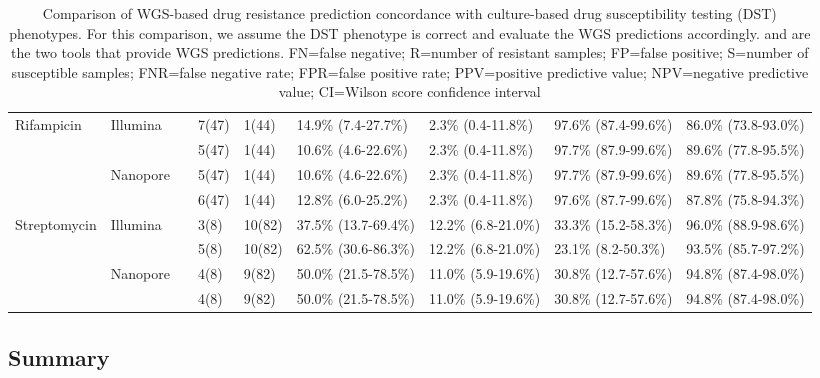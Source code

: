 \begin{table}
{\begin{tabular}{|l|l|l|l|l|l|l|l|l|}
\multirow{4}{*}{Rifampicin} &
  \multirow{2}{*}{Illumina} &
  \drprg{} &
  7(47) &
  1(44) &
  14.9\% (7.4-27.7\%) &
  2.3\% (0.4-11.8\%) &
  97.6\% (87.4-99.6\%) &
  86.0\% (73.8-93.0\%) \\ \cline{3-9} 
 &
   &
  \mykrobe{} &
  5(47) &
  1(44) &
  10.6\% (4.6-22.6\%) &
  2.3\% (0.4-11.8\%) &
  97.7\% (87.9-99.6\%) &
  89.6\% (77.8-95.5\%) \\ \cline{2-9} 
 &
  \multirow{2}{*}{Nanopore} &
  \drprg{} &
  5(47) &
  1(44) &
  10.6\% (4.6-22.6\%) &
  2.3\% (0.4-11.8\%) &
  97.7\% (87.9-99.6\%) &
  89.6\% (77.8-95.5\%) \\ \cline{3-9} 
 &
   &
  \mykrobe{} &
  6(47) &
  1(44) &
  12.8\% (6.0-25.2\%) &
  2.3\% (0.4-11.8\%) &
  97.6\% (87.7-99.6\%) &
  87.8\% (75.8-94.3\%) \\ \hline
\multirow{4}{*}{Streptomycin} &
  \multirow{2}{*}{Illumina} &
  \drprg{} &
  3(8) &
  10(82) &
  37.5\% (13.7-69.4\%) &
  12.2\% (6.8-21.0\%) &
  33.3\% (15.2-58.3\%) &
  96.0\% (88.9-98.6\%) \\ \cline{3-9} 
 &
   &
  \mykrobe{} &
  5(8) &
  10(82) &
  62.5\% (30.6-86.3\%) &
  12.2\% (6.8-21.0\%) &
  23.1\% (8.2-50.3\%) &
  93.5\% (85.7-97.2\%) \\ \cline{2-9} 
 &
  \multirow{2}{*}{Nanopore} &
  \drprg{} &
  4(8) &
  9(82) &
  50.0\% (21.5-78.5\%) &
  11.0\% (5.9-19.6\%) &
  30.8\% (12.7-57.6\%) &
  94.8\% (87.4-98.0\%) \\ \cline{3-9} 
 &
   &
  \mykrobe{} &
  4(8) &
  9(82) &
  50.0\% (21.5-78.5\%) &
  11.0\% (5.9-19.6\%) &
  30.8\% (12.7-57.6\%) &
  94.8\% (87.4-98.0\%) \\ \hline
\end{tabular}%
}
\caption{Comparison of WGS-based drug resistance prediction concordance with culture-based drug susceptibility testing (DST) phenotypes. For this comparison, we assume the DST phenotype is correct and evaluate the WGS predictions accordingly. \drprg{} and \mykrobe{} are the two tools that provide WGS predictions. FN=false negative; R=number of resistant samples; FP=false positive; S=number of susceptible samples; FNR=false negative rate; FPR=false positive rate; PPV=positive predictive value; NPV=negative predictive value; CI=Wilson score confidence interval}
\label{tab:pheno-concordance}
\end{table}

\subsection{Summary}

